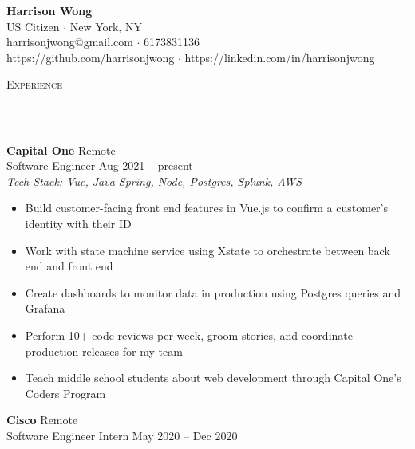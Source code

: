 \documentclass[11pt]{article}
\begin{document}
\small
\center
	\textbf{\huge Harrison Wong}  \\
	\vspace{0.05in}
	US Citizen $\cdot$ New York, NY\\
	harrisonjwong@gmail.com $\cdot$ 6173831136 \\
	https://github.com/harrisonjwong $\cdot$ https://linkedin.com/in/harrisonjwong \\
	\vspace{0.1in}
	
\begin{raggedright}
	
	
	\textsc{\Large Experience} \\
	\vspace{-0.1in}
	\rule{\textwidth}{0.4pt} \\
	\vspace{0.05in}
	
	\textbf{\large Capital One} \hfill Remote \\
	Software Engineer \hfill Aug 2021 -- present \\
	\textit{Tech Stack: Vue, Java Spring, Node, Postgres, Splunk, AWS} \\
	\begin{itemize}
		\item Build customer-facing front end features in Vue.js to confirm a customer's identity with their ID
		\item Work with state machine service using Xstate to orchestrate between back end and front end
		\item Create dashboards to monitor data in production using Postgres queries and Grafana
		\item Perform 10+ code reviews per week, groom stories, and coordinate production releases for my team
		\item Teach middle school students about web development through Capital One's Coders Program
	\end{itemize}
	\vspace{0.10in}
	
	\textbf{\large Cisco} \hfill Remote  \\
	Software Engineer Intern \hfill May 2020 -- Dec 2020 \\


\end{raggedright}
\end{document}
